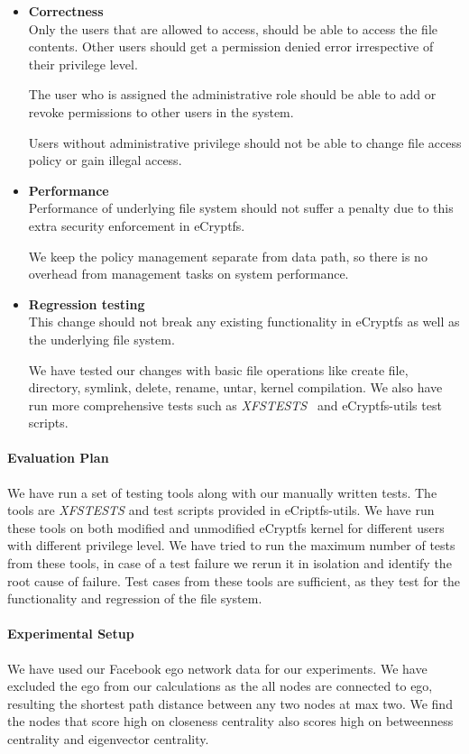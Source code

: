 \begin{itemize}
\item
\textbf{Correctness}\\
Only the users that are allowed to access, should be able to access
the file contents.  Other users should get a permission denied error
irrespective of their privilege level.

The user who is assigned the administrative role should be able to add
or revoke permissions to other users in the system.

Users without administrative privilege should not be able to change
file access policy or gain illegal access.
\item
\textbf{Performance}\\ Performance of underlying file system should
not suffer a penalty due to this extra security enforcement in
eCryptfs.

We keep the policy management separate from data path, so there is no
overhead from management tasks on system performance.
\item
\textbf{Regression testing}\\ This change should not break any
existing functionality in eCryptfs as well as the underlying file
system.

We have tested our changes with basic file operations like create
file, directory, symlink, delete, rename, untar, kernel compilation.
We also have run more comprehensive tests such as
\emph{XFSTESTS}~\cite{xfstests} and eCryptfs-utils test scripts.
\end{itemize}

\paragraph{Evaluation Plan}
We have run a set of testing tools along with our manually written
tests.  The tools are \emph{XFSTESTS} and test scripts provided in
eCriptfs-utils.  We have run these tools on both modified and
unmodified eCryptfs kernel for different users with different
privilege level.  We have tried to run the maximum number of tests
from these tools, in case of a test failure we rerun it in isolation and
identify the root cause of failure.  Test cases from these tools are
sufficient, as they test for the functionality and regression of the file
system.

\paragraph{Experimental Setup}
We have used our Facebook ego network data for our experiments.
We have excluded the ego from our calculations as the all nodes are
connected to ego, resulting the shortest path distance between any
two nodes at max two.  We find the nodes that score high on closeness
centrality also scores high on betweenness centrality and eigenvector
centrality.


